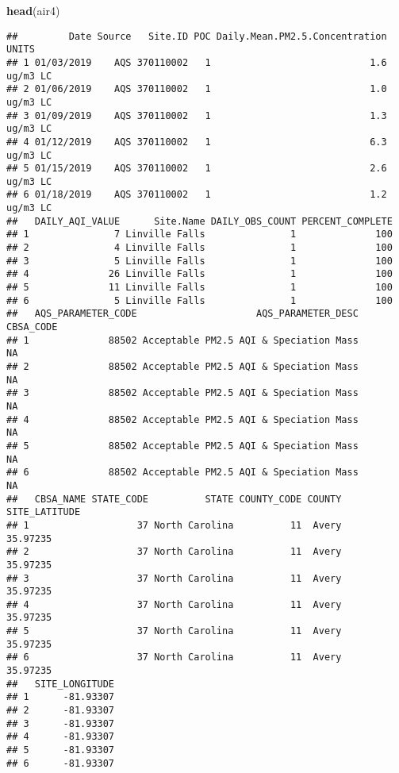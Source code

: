 \documentclass[]{article}
\newenvironment{Shaded}{\begin{snugshade}}{\end{snugshade}}
\newcommand{\KeywordTok}[1]{\textcolor[rgb]{0.13,0.29,0.53}{\textbf{#1}}}
\newcommand{\NormalTok}[1]{#1}
\begin{document}
\begin{Shaded}
\begin{Highlighting}[]
\KeywordTok{head}\NormalTok{(air4)}
\end{Highlighting}
\end{Shaded}

\begin{verbatim}
##         Date Source   Site.ID POC Daily.Mean.PM2.5.Concentration    UNITS
## 1 01/03/2019    AQS 370110002   1                            1.6 ug/m3 LC
## 2 01/06/2019    AQS 370110002   1                            1.0 ug/m3 LC
## 3 01/09/2019    AQS 370110002   1                            1.3 ug/m3 LC
## 4 01/12/2019    AQS 370110002   1                            6.3 ug/m3 LC
## 5 01/15/2019    AQS 370110002   1                            2.6 ug/m3 LC
## 6 01/18/2019    AQS 370110002   1                            1.2 ug/m3 LC
##   DAILY_AQI_VALUE      Site.Name DAILY_OBS_COUNT PERCENT_COMPLETE
## 1               7 Linville Falls               1              100
## 2               4 Linville Falls               1              100
## 3               5 Linville Falls               1              100
## 4              26 Linville Falls               1              100
## 5              11 Linville Falls               1              100
## 6               5 Linville Falls               1              100
##   AQS_PARAMETER_CODE                     AQS_PARAMETER_DESC CBSA_CODE
## 1              88502 Acceptable PM2.5 AQI & Speciation Mass        NA
## 2              88502 Acceptable PM2.5 AQI & Speciation Mass        NA
## 3              88502 Acceptable PM2.5 AQI & Speciation Mass        NA
## 4              88502 Acceptable PM2.5 AQI & Speciation Mass        NA
## 5              88502 Acceptable PM2.5 AQI & Speciation Mass        NA
## 6              88502 Acceptable PM2.5 AQI & Speciation Mass        NA
##   CBSA_NAME STATE_CODE          STATE COUNTY_CODE COUNTY SITE_LATITUDE
## 1                   37 North Carolina          11  Avery      35.97235
## 2                   37 North Carolina          11  Avery      35.97235
## 3                   37 North Carolina          11  Avery      35.97235
## 4                   37 North Carolina          11  Avery      35.97235
## 5                   37 North Carolina          11  Avery      35.97235
## 6                   37 North Carolina          11  Avery      35.97235
##   SITE_LONGITUDE
## 1      -81.93307
## 2      -81.93307
## 3      -81.93307
## 4      -81.93307
## 5      -81.93307
## 6      -81.93307
\end{verbatim}
\end{document}

